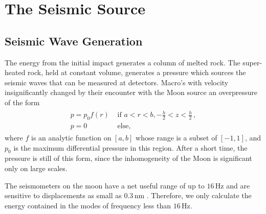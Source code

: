 \documentclass[prd,reprint,10pt]{revtex4-1}
\newcommand*\te[1]{\text{#1}}
\newcommand*\f[2]{\frac{#1}{#2}}
\begin{document}
\section{The Seismic Source}
\subsection{Seismic Wave Generation}
The energy from the initial impact generates a column of melted rock. The super-heated rock, held at constant volume, generates a pressure which sources the seismic waves that can be measured at detectors. Macro's with velocity insignificantly changed by their encounter with the Moon source an overpressure of the form
\begin{align}
\begin{array}{cc}p = p_0 f(r)&\te{ if }a<r<b,-\f h2<z<\f h2\,,\\ p = 0&\te{ else,}\end{array}
\end{align}
where $f$ is an analytic function on $[a,b]$ whose range is a subset of $[-1,1]$, and $p_0$ is the maximum differential pressure in this region. After a short time, the pressure is still of this form, since the inhomogeneity of the Moon is significant only on large scales.

The seismometers on the moon have a net useful range of up to $16\,\te{Hz}$ and are sensitive to displacements as small as $0.3\,\text{nm}$ \cite{latham1973lunar}\cite{nakamura1982apollo}. Therefore, we only calculate the energy contained in the modes of frequency less than $16\,\te{Hz}$. 
\end{document}
